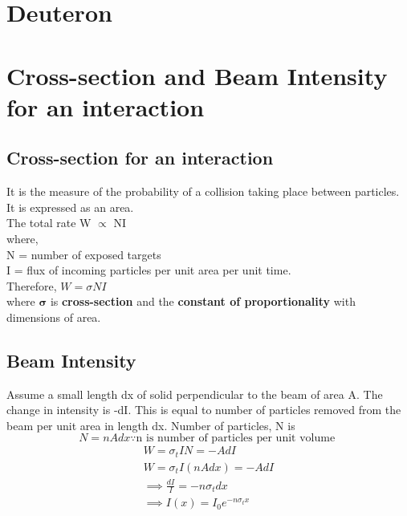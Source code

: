 \documentclass[11pt, a4paper]{article}
\begin{document}
\section{Deuteron}
\section{Cross-section and Beam Intensity for an interaction}      
\label{sec:1} 
\subsection*{ Cross-section for an interaction }
It is the measure of the probability of a collision taking place between particles. It is expressed as an area.\\
The total rate W $\propto$ NI \\
where, \\ N = number of exposed targets \\ I = flux of incoming particles per unit area per unit time. \\
Therefore, \(W = \sigma N I \)  \\
where \(\mathbf{\sigma}\) is \textbf{cross-section} and the \textbf{constant of proportionality} with dimensions of area.

\subsection*{Beam Intensity}
Assume a small length dx of solid perpendicular to the beam of area A. The change in intensity is -dI. This is equal to number of particles removed from the beam per unit area in length dx. 
Number of particles, N is 
\[
    N = n A dx \because \text{n is number of particles per unit volume }
\]
\begin{gather}
    W = \sigma_t I N = - A dI \\
    W = \sigma_t I (n A dx) = - A dI\\
    \implies \frac{dI}{I} = - n \sigma_t dx \\
    \implies I(x) = I_0 e^{-n\sigma_t x}
\end{gather}
\end{document}

